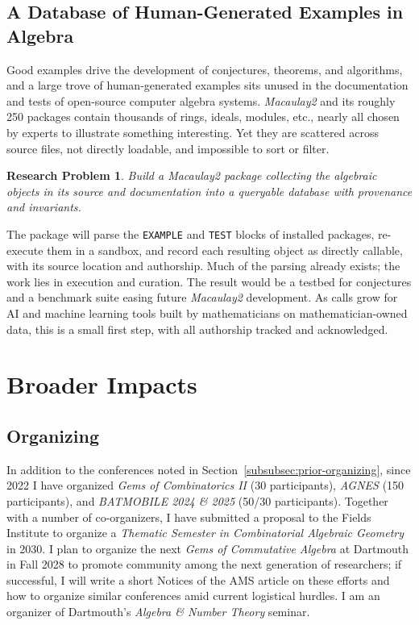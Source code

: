 \documentclass[11pt,reqno]{amsart}
\newtheorem{problem}[lemma]{Research Problem}
\theoremstyle{remark}
\begin{document}
 \subsection{A Database of Human-Generated Examples in Algebra}
Good examples drive the development of conjectures, theorems, and algorithms, and a large trove of human-generated examples sits unused in the documentation and tests of open-source computer algebra systems. \textit{Macaulay2} and its roughly 250 packages contain thousands of rings, ideals, modules, etc., nearly all chosen by experts to illustrate something interesting. Yet they are scattered across source files, not directly loadable, and impossible to sort or filter.

\begin{problem}\label{prob:database-m2}
	Build a \textit{Macaulay2} package collecting the algebraic objects in its source and documentation into a queryable database with provenance and invariants.
\end{problem}

The package will parse the \texttt{EXAMPLE} and \texttt{TEST} blocks of installed packages, re-execute them in a sandbox, and record each resulting object as directly callable, with its source location and authorship. Much of the parsing already exists; the work lies in execution and curation. The result would be a testbed for conjectures and a benchmark suite easing future \textit{Macaulay2} development. As calls grow for AI and machine learning tools built by mathematicians on mathematician-owned data, this is a small first step, with all authorship tracked and acknowledged.

\section{Broader Impacts}\label{sec:broader-impacts} 


\subsection{Organizing} In addition to the conferences noted in Section~\ref{subsubsec:prior-organizing}, since 2022 I have organized \textit{Gems of Combinatorics II} (30 participants), \textit{AGNES} (150 participants), and \textit{BATMOBILE 2024 \& 2025} (50/30 participants). Together with a number of co-organizers, I have submitted a proposal to the Fields Institute to organize a \textit{Thematic Semester in Combinatorial Algebraic Geometry} in 2030. I plan to organize the next \textit{Gems of Commutative Algebra} at Dartmouth in Fall 2028 to promote community among the next generation of researchers; if successful, I will write a short Notices of the AMS article on these efforts and how to organize similar conferences amid current logistical hurdles. I am an organizer of Dartmouth's \textit{Algebra \& Number Theory} seminar. 
\end{document}
